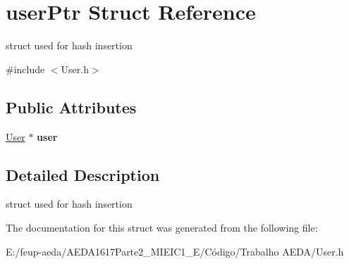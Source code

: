\hypertarget{structuser_ptr}{}\section{user\+Ptr Struct Reference}
\label{structuser_ptr}


struct used for hash insertion  




{\ttfamily \#include $<$User.\+h$>$}

\subsection*{Public Attributes}
\begin{DoxyCompactItemize}
\item 
\hyperlink{class_user}{User} $\ast$ {\bfseries user}
\end{DoxyCompactItemize}


\subsection{Detailed Description}
struct used for hash insertion 

The documentation for this struct was generated from the following file\+:\begin{DoxyCompactItemize}
\item 
E\+:/feup-\/aeda/\+A\+E\+D\+A1617\+Parte2\+\_\+M\+I\+E\+I\+C1\+\_\+\+E/\+Código/\+Trabalho A\+E\+D\+A/User.\+h\end{DoxyCompactItemize}

